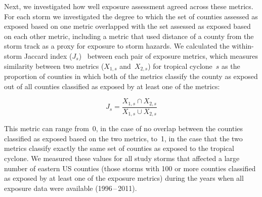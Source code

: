 Next, we investigated how well exposure assessment agreed across 
these metrics. For each storm we investigated the degree to which the 
set of counties assessed as exposed based on one metric overlapped with the set
assessed as exposed based on each other metric, including a metric that used
distance of a county from the storm track as a proxy for exposure to storm hazards. 
We calculated the within-storm
Jaccard index ($J_s$)~\parencite{jaccard1901distribution, jaccard1908nouvelles} between
each pair of exposure metrics, which measures similarity
between two metrics ($X_{1,s}$ and~$X_{2,s}$) for tropical cyclone~$s$ as the
proportion of counties in which both of the metrics classify the county as
exposed out of all counties classified as exposed by at least one of the
metrics:

\begin{equation} 
J_s = \frac{X_{1,s} \cap X_{2,s}}{X_{1,s} \cup X_{2,s}}
\end{equation}

\noindent This metric can range from~0, in the case of no overlap between the
counties classified as exposed based on the two metrics, to~1, in the case that
the two metrics classify exactly the same set of counties as exposed to the
tropical cyclone. We measured these values for all study storms that affected a
large number of eastern \ac{US} counties (those storms with 100 or more
counties classified as exposed by at least one of the exposure metrics)
during the years when all exposure data were available (1996\,--\,2011).


